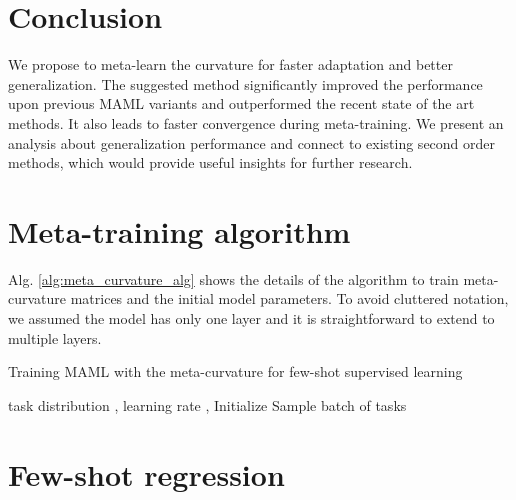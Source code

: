 \documentclass{article}
\begin{document}
\section{Conclusion}
\label{conclusion}
We propose to meta-learn the curvature for faster adaptation and better generalization. The suggested method significantly improved the performance upon previous MAML variants and outperformed the recent state of the art methods. It also leads to faster convergence during meta-training. We present an analysis about generalization performance and connect to existing second order methods, which would provide useful insights for further research.
















\clearpage
\appendix

\section{Meta-training algorithm}
Alg. \ref{alg:meta_curvature_alg} shows the details of the algorithm to train meta-curvature matrices and the initial model parameters. To avoid cluttered notation, we assumed the model has only one layer and it is straightforward to extend to multiple layers.

\begin{algorithm}
\footnotesize
   \caption{Training MAML with the meta-curvature for few-shot supervised learning}
   \label{alg:meta_curvature_alg}
\begin{algorithmic}
\footnotesize
{} task distribution , learning rate , 
\STATE Initialize 
    \STATE Sample batch of tasks 
        \STATE  {}
    \ENDFOR
    \STATE 
    \STATE 
    \STATE 
    \STATE 
\ENDWHILE
\end{algorithmic}
\end{algorithm}

\section{Few-shot regression}
\end{document}
